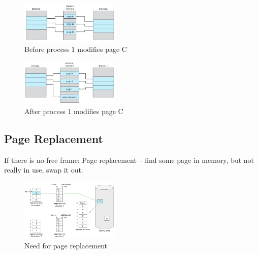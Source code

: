\begin{figure}[!htb]
    \centering
    \includegraphics[width=0.42\textwidth]{pic/OS9/Before process 1 modifies page C}
    \caption{Before process 1 modifies page C}
\end{figure}

\begin{figure}[!htb]
    \centering
    \includegraphics[width=0.42\textwidth]{pic/OS9/After process 1 modifies page C}
    \caption{After process 1 modifies page C}
\end{figure}

\subsection{Page Replacement}
If there is no free frame: Page replacement -- find some page in memory, but not really in use, swap it out. 

\begin{figure}[!htb]
    \centering
    \includegraphics[width=0.42\textwidth]{pic/OS9/Need for page replacement}
    \caption{Need for page replacement}
\end{figure}


